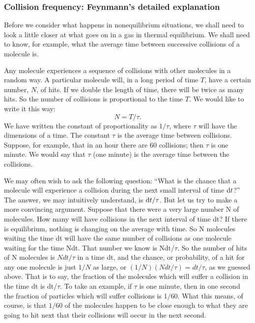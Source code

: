 \begin{subappendices}
\subsubsection{Collision frequency: Feynmann's detailed explanation}

Before we consider what happens in nonequilibrium situations, we shall need to look a little closer at what goes on in a gas in thermal equilibrium. We shall need to know, for example, what the average time between successive collisions of a molecule is.

Any molecule experiences a sequence of collisions with other molecules in a random way. A particular molecule will, in a long period of time $T$, have a certain number, $N$, of hits. If we double the length of time, there will be twice as many hits. So the number of collisions is proportional to the time $T$. We would like to write it this way:
\begin{equation} \label{Q:rates-time}
  N = T/\tau.
\end{equation}
%
We have written the constant of proportionality as $1/\tau$, where $\tau$ will have the dimensions of a time. The constant $\tau$ is the average time between collisions. Suppose, for example, that in an hour there are 60 collisions; then $\tau$ is one minute. We would say that $\tau$ (one minute) is the average time between the collisions.

We may often wish to ask the following question: ``What is the chance that a molecule will experience a collision during the next small interval of time $\mathrm{d} t$?'' The answer, we may intuitively understand, is $\mathrm{d} t/\tau$. But let us try to make a more convincing argument. Suppose that there were a very large number N of molecules. How many will have collisions in the next interval of time dt? If there is equilibrium, nothing is changing on the average with time. So N molecules waiting the time dt will have the same number of collisions as one molecule waiting for the time Ndt. That number we know is Ndt/$\tau$. So the number of hits of N molecules is $Ndt/\tau$ in a time dt, and the chance, or probability, of a hit for any one molecule is just $1/N$ as large, or $(1/N)(Ndt/\tau)=dt/\tau$, as we guessed above. That is to say, the fraction of the molecules which will suffer a collision in the time dt is dt/$\tau$. To take an example, if $\tau$ is one minute, then in one second the fraction of particles which will suffer collisions is 1/60. What this means, of course, is that $1/60$ of the molecules happen to be close enough to what they are going to hit next that their collisions will occur in the next second.


\end{subappendices}
